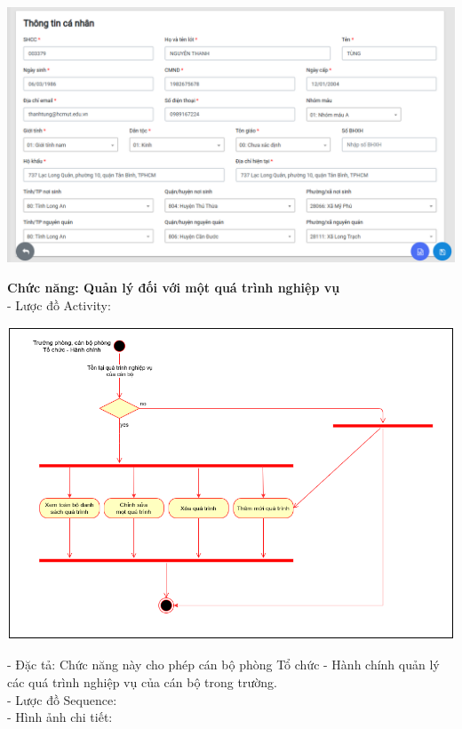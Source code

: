 \begin{center}
  \captionsetup{type=figure}
  \includegraphics[scale=0.5]{img/Screen/edithongtin.png}
\end{center}
\textbf{Chức năng: Quản lý đối với một quá trình nghiệp vụ}\\
- Lược đồ Activity:
\begin{center}
  \captionsetup{type=figure}
  \includegraphics[scale=0.5]{img/UML/TchcStaff/activityQuanLyQT.png}
\end{center}
- Đặc tả: Chức năng này cho phép cán bộ phòng Tổ chức - Hành chính quản lý các quá trình nghiệp vụ của cán bộ trong trường.\\
- Lược đồ Sequence: \\
- Hình ảnh chi tiết:
